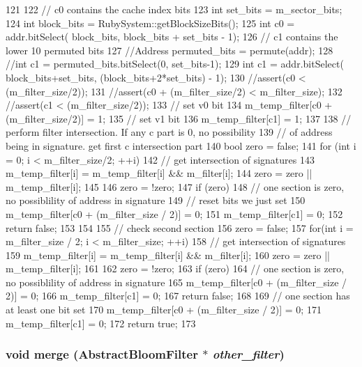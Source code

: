 \begin{DoxyCode}
121 {
122     // c0 contains the cache index bits
123     int set_bits = m_sector_bits;
124     int block_bits = RubySystem::getBlockSizeBits();
125     int c0 = addr.bitSelect( block_bits, block_bits + set_bits - 1);
126     // c1 contains the lower 10 permuted bits
127     //Address permuted_bits = permute(addr);
128     //int c1 = permuted_bits.bitSelect(0, set_bits-1);
129     int c1 = addr.bitSelect( block_bits+set_bits, (block_bits+2*set_bits) - 1);
130     //assert(c0 < (m_filter_size/2));
131     //assert(c0 + (m_filter_size/2) < m_filter_size);
132     //assert(c1 < (m_filter_size/2));
133     // set v0 bit
134     m_temp_filter[c0 + (m_filter_size/2)] = 1;
135     // set v1 bit
136     m_temp_filter[c1] = 1;
137 
138     // perform filter intersection. If any c part is 0, no possibility
139     // of address being in signature.  get first c intersection part
140     bool zero = false;
141     for (int i = 0; i < m_filter_size/2; ++i){
142         // get intersection of signatures
143         m_temp_filter[i] = m_temp_filter[i] && m_filter[i];
144         zero = zero || m_temp_filter[i];
145     }
146     zero = !zero;
147     if (zero) {
148         // one section is zero, no possiblility of address in signature
149         // reset bits we just set
150         m_temp_filter[c0 + (m_filter_size / 2)] = 0;
151         m_temp_filter[c1] = 0;
152         return false;
153     }
154 
155     // check second section
156     zero = false;
157     for(int i = m_filter_size / 2; i < m_filter_size; ++i) {
158         // get intersection of signatures
159         m_temp_filter[i] =  m_temp_filter[i] && m_filter[i];
160         zero = zero || m_temp_filter[i];
161     }
162     zero = !zero;
163     if (zero) {
164         // one section is zero, no possiblility of address in signature
165         m_temp_filter[c0 + (m_filter_size / 2)] = 0;
166         m_temp_filter[c1] = 0;
167         return false;
168     }
169     // one section has at least one bit set
170     m_temp_filter[c0 + (m_filter_size / 2)] = 0;
171     m_temp_filter[c1] = 0;
172     return true;
173 }
\end{DoxyCode}
\hypertarget{classBulkBloomFilter_a4091f5f95de040d4e0ae5bd86817b13c}{
\subsubsection[{merge}]{\setlength{\rightskip}{0pt plus 5cm}void merge ({\bf AbstractBloomFilter} $\ast$ {\em other\_\-filter})}}
\label{classBulkBloomFilter_a4091f5f95de040d4e0ae5bd86817b13c}



